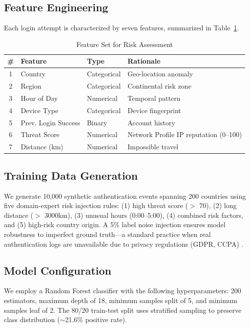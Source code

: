 \documentclass[conference]{IEEEtran}
\begin{document}
\subsection{Feature Engineering}

Each login attempt is characterized by seven features, summarized in Table~\ref{tab:features}.

\begin{table}[h]
\centering
\caption{Feature Set for Risk Assessment}
\label{tab:features}
\begin{tabular}{@{}clll@{}}
\toprule
\# & Feature & Type & Rationale \\
\midrule
1 & Country & Categorical & Geo-location anomaly \\
2 & Region & Categorical & Continental risk zone \\
3 & Hour of Day & Numerical & Temporal pattern \\
4 & Device Type & Categorical & Device fingerprint \\
5 & Prev. Login Success & Binary & Account history \\
6 & Threat Score & Numerical & Network Profile IP reputation (0--100) \\
7 & Distance (km) & Numerical & Impossible travel \\
\bottomrule
\end{tabular}
\end{table}

\subsection{Training Data Generation}

We generate 10,000 synthetic authentication events spanning 200 countries using five domain-expert risk injection rules: (1) high threat score ($>$ 70), (2) long distance ($>$ 3000km), (3) unusual hours (0:00--5:00), (4) combined risk factors, and (5) high-risk country origin. A 5\% label noise injection ensures model robustness to imperfect ground truth---a standard practice when real authentication logs are unavailable due to privacy regulations (GDPR, CCPA) \cite{wiefling2019, freeman2016}.

\subsection{Model Configuration}

We employ a Random Forest classifier with the following hyperparameters: 200 estimators, maximum depth of 18, minimum samples split of 5, and minimum samples leaf of 2. The 80/20 train-test split uses stratified sampling to preserve class distribution ($\sim$21.6\% positive rate).
\end{document}

